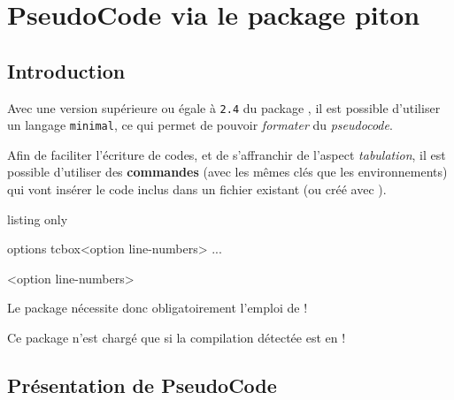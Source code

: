 \newpage

\section{PseudoCode via le package piton}\label{pitonpcode}

\subsection{Introduction}

\begin{noteblock}
 Avec une version supérieure ou égale à \texttt{2.4} du package , il est possible d'utiliser un langage \texttt{minimal}, ce qui permet de pouvoir \textit{formater} du \textit{pseudocode}.

\smallskip

 Afin de faciliter l'écriture de codes, et de s'affranchir de l'aspect \textit{tabulation}, il est possible d'utiliser des \textbf{commandes} (avec les mêmes clés que les environnements) qui vont insérer le code inclus dans un fichier existant (ou créé avec ).
\end{noteblock}

\begin{PresCodeTexPL}{listing only}
\begin{PseudoCodePiton}[options]{options tcbox}<option line-numbers>
	...
\end{PseudoCodePiton}


<option line-numbers>
\end{PresCodeTexPL}

\begin{warningblock}
Le package  nécessite donc obligatoirement l’emploi de  !

Ce package n'est chargé que si la compilation détectée est en  !
\end{warningblock}

\subsection{Présentation de PseudoCode}

